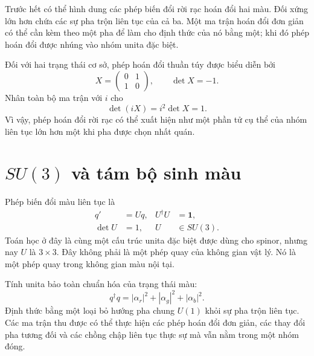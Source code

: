 Trước hết có thể hình dung các phép biến đổi rời rạc hoán đổi hai màu. Đối xứng
lớn hơn chứa các sự pha trộn liên tục của cả ba. Một ma trận hoán đổi đơn giản
có thể cần kèm theo một pha để làm cho định thức của nó bằng một; khi đó phép
hoán đổi được nhúng vào nhóm unita đặc biệt.

Đối với hai trạng thái cơ sở, phép hoán đổi thuần túy được biểu diễn bởi
\begin{equation}
X=
\begin{pmatrix}0&1\\1&0\end{pmatrix},
\qquad
\det X=-1.
\end{equation}
Nhân toàn bộ ma trận với \(i\) cho
\begin{equation}
\det(iX)=i^2\det X=1.
\end{equation}
Vì vậy, phép hoán đổi rời rạc có thể xuất hiện như một phần tử cụ thể của
nhóm liên tục lớn hơn một khi pha được chọn nhất quán.

\begin{classroomqa}
\end{classroomqa}

\section{\texorpdfstring{\(SU(3)\)}{SU(3)} và tám bộ sinh màu}

Phép biến đổi màu liên tục là
\begin{equation}
\begin{aligned}
q'&=Uq,
&
U^\dagger U&=\boldsymbol 1,
\\
\det U&=1,
&
U&\in SU(3).
\end{aligned}
\label{eq:l3-su3-action}
\end{equation}
Toán học ở đây là cùng một cấu trúc unita đặc biệt được dùng cho spinor,
nhưng nay \(U\) là \(3\times3\). Đây không phải là một phép quay của không gian vật lý. Nó là
một phép quay trong không gian màu nội tại.

Tính unita bảo toàn chuẩn hóa của trạng thái màu:
\begin{equation}
q^\dagger q
=|\alpha_r|^2+|\alpha_g|^2+|\alpha_b|^2.
\end{equation}
Định thức bằng một loại bỏ hướng pha chung \(U(1)\) khỏi sự pha trộn liên tục.
Các ma trận thu được có thể thực hiện các phép hoán đổi đơn giản, các thay đổi
pha tương đối và các chồng chập liên tục thực sự mà vẫn nằm trong một nhóm đóng.

